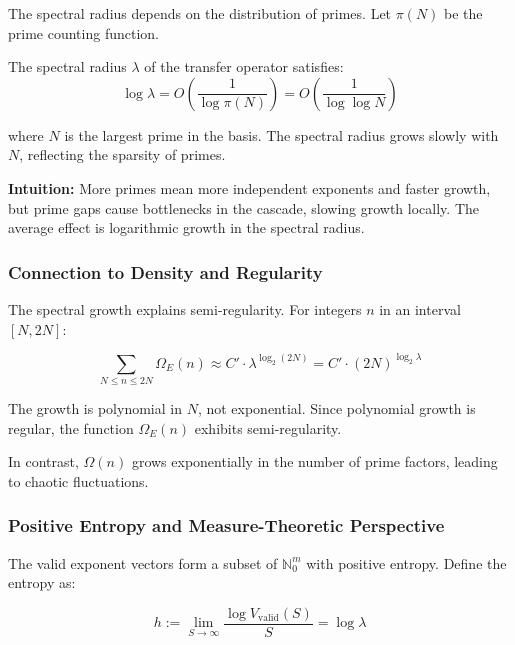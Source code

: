 The spectral radius depends on the distribution of primes. Let $\pi(N)$ be the prime counting function.

\begin{theorem}
The spectral radius $\lambda$ of the transfer operator satisfies:
\begin{equation}
\log \lambda = O\left(\frac{1}{\log \pi(N)}\right) = O\left(\frac{1}{\log \log N}\right)
\end{equation}

where $N$ is the largest prime in the basis. The spectral radius grows slowly with $N$, reflecting the sparsity of primes.
\end{theorem}

\textbf{Intuition:} More primes mean more independent exponents and faster growth, but prime gaps cause bottlenecks in the cascade, slowing growth locally. The average effect is logarithmic growth in the spectral radius.

\subsubsection{Connection to Density and Regularity}

The spectral growth explains semi-regularity. For integers $n$ in an interval $[N, 2N]$:

\begin{equation}
\sum_{N \leq n \leq 2N} \Omega_E(n) \approx C' \cdot \lambda^{\log_2(2N)} = C' \cdot (2N)^{\log_2 \lambda}
\end{equation}

The growth is polynomial in $N$, not exponential. Since polynomial growth is regular, the function $\Omega_E(n)$ exhibits semi-regularity.

In contrast, $\Omega(n)$ grows exponentially in the number of prime factors, leading to chaotic fluctuations.

\subsubsection{Positive Entropy and Measure-Theoretic Perspective}

The valid exponent vectors form a subset of $\mathbb{N}_0^m$ with positive entropy. Define the entropy as:

\begin{equation}
h := \lim_{S \to \infty} \frac{\log V_{\text{valid}}(S)}{S} = \log \lambda
\end{equation}

